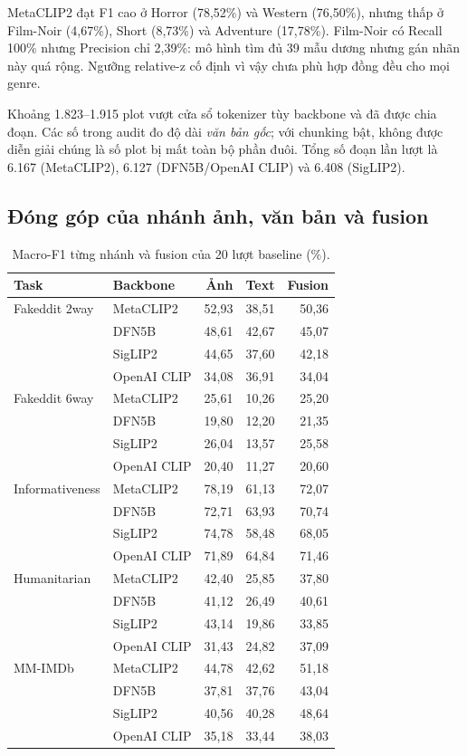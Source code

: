\documentclass[12pt,a4paper]{article}
\begin{document}
MetaCLIP2 đạt F1 cao ở Horror (78,52\%) và Western (76,50\%), nhưng thấp ở Film-Noir (4,67\%), Short (8,73\%) và Adventure (17,78\%). Film-Noir có Recall 100\% nhưng Precision chỉ 2,39\%: mô hình tìm đủ 39 mẫu dương nhưng gán nhãn này quá rộng. Ngưỡng relative-z cố định vì vậy chưa phù hợp đồng đều cho mọi genre.

Khoảng 1.823--1.915 plot vượt cửa sổ tokenizer tùy backbone và đã được chia đoạn. Các số  trong audit đo độ dài \emph{văn bản gốc}; với chunking bật, không được diễn giải chúng là số plot bị mất toàn bộ phần đuôi. Tổng số đoạn lần lượt là 6.167 (MetaCLIP2), 6.127 (DFN5B/OpenAI CLIP) và 6.408 (SigLIP2).

\subsection{Đóng góp của nhánh ảnh, văn bản và fusion}
\begin{table}[H]\centering\small
\caption{Macro-F1 từng nhánh và fusion của 20 lượt baseline (\%).}\label{tab:branches}
\begin{tabular}{llrrr}\toprule
\textbf{Task}&\textbf{Backbone}&\textbf{Ảnh}&\textbf{Text}&\textbf{Fusion}\\\midrule
Fakeddit 2way&MetaCLIP2&52,93&38,51&50,36\\
&DFN5B&48,61&42,67&45,07\\
&SigLIP2&44,65&37,60&42,18\\
&OpenAI CLIP&34,08&36,91&34,04\\
\midrule
Fakeddit 6way&MetaCLIP2&25,61&10,26&25,20\\
&DFN5B&19,80&12,20&21,35\\
&SigLIP2&26,04&13,57&25,58\\
&OpenAI CLIP&20,40&11,27&20,60\\
\midrule
Informativeness&MetaCLIP2&78,19&61,13&72,07\\
&DFN5B&72,71&63,93&70,74\\
&SigLIP2&74,78&58,48&68,05\\
&OpenAI CLIP&71,89&64,84&71,46\\
\midrule
Humanitarian&MetaCLIP2&42,40&25,85&37,80\\
&DFN5B&41,12&26,49&40,61\\
&SigLIP2&43,14&19,86&33,85\\
&OpenAI CLIP&31,43&24,82&37,09\\
\midrule
MM-IMDb&MetaCLIP2&44,78&42,62&51,18\\
&DFN5B&37,81&37,76&43,04\\
&SigLIP2&40,56&40,28&48,64\\
&OpenAI CLIP&35,18&33,44&38,03\\
\bottomrule\end{tabular}\end{table}
\end{document}
